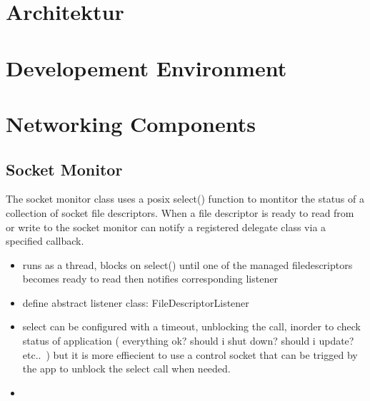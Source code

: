 \section{Architektur}

\section{Developement Environment}

\section{Networking Components}

\subsection{Socket Monitor}

The socket monitor class uses a posix select() function to montitor the status of a collection of socket file descriptors. When a file descriptor is ready to read from or write to the socket monitor can notify a registered delegate class via a specified callback.

\begin{itemize}

\item runs as a thread, blocks on select() until one of the managed filedescriptors becomes ready to read then notifies corresponding listener

\item define abstract listener class: FileDescriptorListener
\item select can be configured with a timeout, unblocking the call, inorder to check status of application ( everything ok? should i shut down? should i update? etc.. ) but it is more effiecient to use a control socket that can be trigged by the app to unblock the select call when needed.
\item


\end{itemize}
